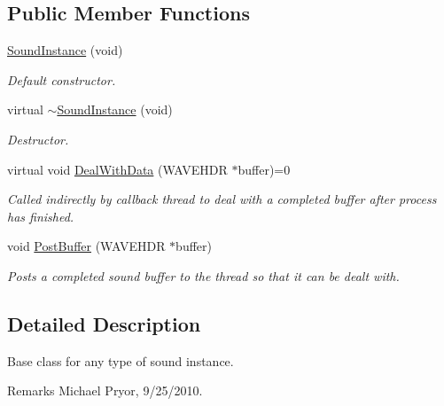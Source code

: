 \subsection*{Public Member Functions}
\begin{DoxyCompactItemize}
\item 
\hyperlink{class_sound_instance_a23e2f78d7fd85e3eb0709afce053430b}{SoundInstance} (void)
\begin{DoxyCompactList}\small\item\em Default constructor. \item\end{DoxyCompactList}\item 
\hypertarget{class_sound_instance_a98b7aadeceba0d94ba93d47c6780c4da}{
virtual \hyperlink{class_sound_instance_a98b7aadeceba0d94ba93d47c6780c4da}{$\sim$SoundInstance} (void)}
\label{class_sound_instance_a98b7aadeceba0d94ba93d47c6780c4da}

\begin{DoxyCompactList}\small\item\em Destructor. \item\end{DoxyCompactList}\item 
virtual void \hyperlink{class_sound_instance_a0dfcabaf68f2aa2e90ca6a9cd5310b3c}{DealWithData} (WAVEHDR $\ast$buffer)=0
\begin{DoxyCompactList}\small\item\em Called indirectly by callback thread to deal with a completed buffer after process has finished. \item\end{DoxyCompactList}\item 
void \hyperlink{class_sound_instance_abadeef00fe1a08671f76b38142a420d5}{PostBuffer} (WAVEHDR $\ast$buffer)
\begin{DoxyCompactList}\small\item\em Posts a completed sound buffer to the thread so that it can be dealt with. \item\end{DoxyCompactList}\end{DoxyCompactItemize}


\subsection{Detailed Description}
Base class for any type of sound instance. \begin{DoxyRemark}{Remarks}
Michael Pryor, 9/25/2010. 
\end{DoxyRemark}


